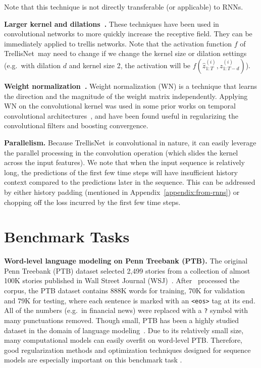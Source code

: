 \documentclass{article} \usepackage{iclr2019_conference,times}
\newcommand\mypara[1]{\vspace{0mm}\noindent\textbf{#1}}
\newcommand{\model}{TrellisNet}
\begin{document}
Note that this technique is not directly transferable (or applicable) to RNNs.

\mypara{Larger kernel and dilations~\citep{dilatedConv}.} These techniques have been used in convolutional networks to more quickly increase the receptive field. They can be immediately applied to trellis networks. Note that the activation function $f$ of \model~may need to change if we change the kernel size or dilation settings (e.g.\ with dilation $d$ and kernel size 2, the activation will be \small$f(\hat{z}_{1:T}^{(i)}, z_{1:T-d}^{(i)})$\normalsize).

\mypara{Weight normalization~\citep{Salimans2016}.} Weight normalization (WN) is a technique that learns the direction and the magnitude of the weight matrix independently. Applying WN on the convolutional kernel was used in some prior works on temporal convolutional architectures~\citep{dauphinGatedConv,bai2018empirical}, and have been found useful in regularizing the convolutional filters and boosting convergence.

\mypara{Parallelism.} Because \model~is convolutional in nature, it can easily leverage the parallel processing in the convolution operation (which slides the kernel across the input features). We note that when the input sequence is relatively long, the predictions of the first few time steps will have insufficient history context compared to the predictions later in the sequence. This can be addressed by either history padding (mentioned in Appendix~\ref{appendix:from-rnns}) or chopping off the loss incurred by the first few time steps.


\section{Benchmark Tasks}
\label{appendix:task-description}

\mypara{Word-level language modeling on Penn Treebank (PTB).} The original Penn Treebank (PTB) dataset selected 2,499 stories from a collection of almost 100K stories published in Wall Street Journal (WSJ)~\citep{Marcus93buildinga}. After \cite{Mikolov2010PTB}~processed the corpus, the PTB dataset contains 888K words for training, 70K for validation and 79K for testing, where each sentence is marked with an \texttt{<eos>} tag at its end. All of the numbers (e.g.\ in financial news) were replaced with a \texttt{?} symbol with many punctuations removed. Though small, PTB has been a highly studied dataset in the domain of language modeling~\citep{miyamoto2016gated,zilly2017recurrent,merityRegOpt,Melis2018,yang2018breaking}.
Due to its relatively small size, many computational models can easily overfit on word-level PTB. Therefore, good regularization methods and optimization techniques designed for sequence models are especially important on this benchmark task \citep{merityRegOpt}.
\end{document}
